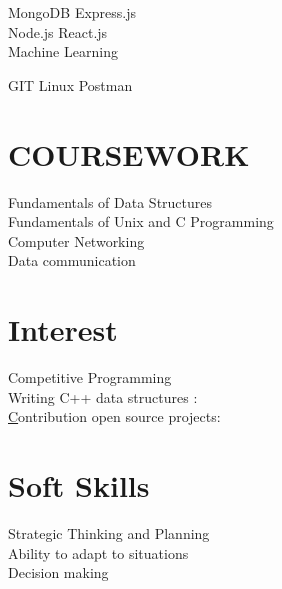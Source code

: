 \documentclass[]{deedy-resume-openfont}
\begin{document}
\begin{minipage}[t]{0.33\textwidth}
 \textbullet{} MongoDB 
\textbullet{}Express.js  \\ \textbullet{} Node.js
\textbullet{} React.js\\  \textbullet{} Machine Learning
 
 
 \textbullet{} GIT \textbullet{}Linux \textbullet{}Postman
\sectionsep


\section{COURSEWORK}
\textbullet{}Fundamentals of Data Structures\\
\textbullet{}Fundamentals of Unix and C
 Programming \\
\textbullet{}Computer Networking\\
\textbullet{}Data communication \\



\section{Interest}
\textbullet{}Competitive Programming\\
\textbullet{}Writing C++ data structures : \href{https://github.com/llucifer97/Algorithms-Datastructure}{}\\
\textbullet{}\href{}Contribution open source projects: \href{https://github.com/pulls?q=is%3Apr+author%3Allucifer97+archived%3Afalse+is%3Aclosed}{\custombold{Link}}\\



 \section{Soft Skills}
 \textbullet{}Strategic Thinking and Planning\\
\textbullet{}Ability to adapt to situations\\
 \textbullet{}Decision making
 \sectionsep
%
%

\end{minipage} 
\hfill
\end{document}
